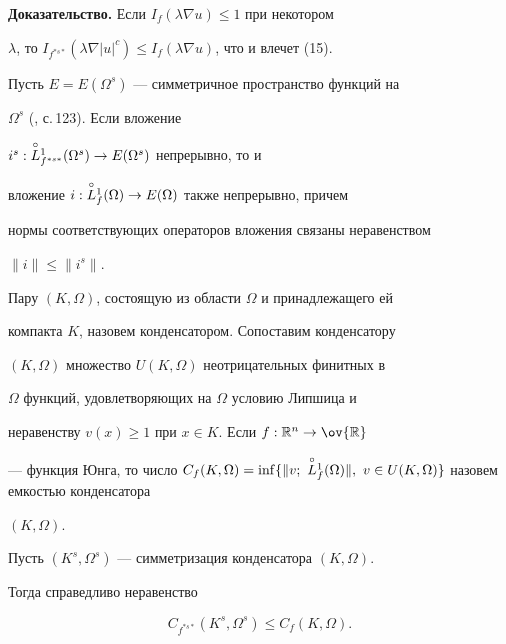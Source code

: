  


{\bf Доказательство.} Если $I_f(\lambda\nabla u)\le 1$ при некотором 


$\lambda$, то $I_{f^{*s*}}(\lambda\nabla|u|^c)\le I_f(\lambda\nabla 


u)$, что и влечет (15). 


 


\begin{cornonum} 


Пусть $E=E(\Omega^s)$ --- симметричное пространство функций на 


$\Omega^s$ (\cite{7}, с.\,123). Если вложение 


$i^s:\overset{\circ}{L}{}^1_{f^{*s*}}(\Omega^s)\to E(\Omega^s)$ непрерывно, то и 


вложение $i:\overset{\circ}{L}{}^1_f(\Omega)\to E(\Omega)$ также непрерывно, причем 


нормы соответствующих операторов вложения связаны неравенством 


$\|i\|\le\|i^s\|$. 


\end{cornonum} 


 


Пару $(K,\Omega)$, состоящую из области $\Omega$ и принадлежащего ей 


компакта $K$, назовем конденсатором. Сопоставим конденсатору 


$(K,\Omega)$ множество $U(K,\Omega)$ неотрицательных финитных в 


$\Omega$ функций, удовлетворяющих на $\Omega$ условию Липшица и 


неравенству $v(x)\ge 1$ при $x\in K$. Если $f:\Bbb R^n\to\ov{\Bbb R}$ 


--- функция Юнга, то число $C_f(K,\Omega)=\inf\{\|v;\ 


\cL^1_f(\Omega)\|,\ v\in U(K,\Omega)\}$ назовем емкостью конденсатора 


$(K,\Omega)$. 


 


\begin{thm} 


Пусть $(K^s,\Omega^s)$ --- симметризация конденсатора $(K,\Omega)$. 


Тогда справедливо неравенство 


\begin{equation} 


C_{f^{*s*}}(K^s,\Omega^s)\le C_f(K,\Omega). 


\end{equation} 


\end{thm} 


